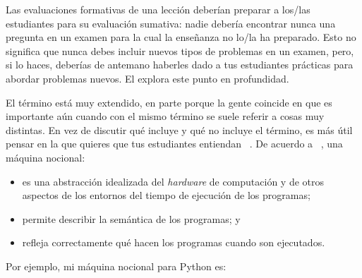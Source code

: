 Las evaluaciones formativas de una lección deberían preparar a los/las estudiantes para su evaluación sumativa:
nadie debería encontrar nunca una pregunta en un examen para la cual la enseñanza no lo/la ha preparado.
Esto no significa que nunca debes incluir nuevos tipos de problemas en un examen, pero, si lo haces,
deberías de antemano haberles dado a tus estudiantes prácticas para abordar problemas nuevos. 
El  explora este punto en profundidad.


El término  está muy extendido,
en parte porque la gente coincide en que es importante aún cuando con el mismo término se suele referir a cosas muy distintas.
En vez de discutir qué incluye y qué no incluye el término,
es más útil pensar en la 
que quieres que tus estudiantes entiendan ~\cite{DuBo1986}.
De acuerdo a ~\cite{Sorv2013},
una máquina nocional:

\begin{itemize}

\item
es una abstracción idealizada del \emph{hardware} de computación  
y de otros aspectos de los entornos del tiempo de ejecución de los programas;

\item
  permite describir la semántica de los programas;
  y

\item
  refleja correctamente qué hacen los programas cuando son ejecutados.

\end{itemize}

\noindent
Por ejemplo, mi máquina nocional para Python es:

